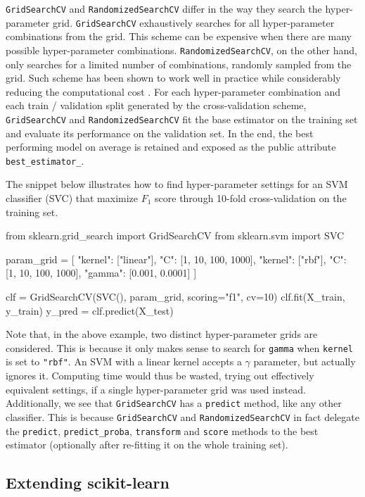 \documentclass{llncs}
\begin{document}
\texttt{GridSearchCV} and \texttt{RandomizedSearchCV} differ in the way they
search the hyper-parameter grid.  \texttt{GridSearchCV} exhaustively searches
for all hyper-parameter combinations from the grid. This scheme can be expensive
when there are many possible hyper-parameter combinations.
\texttt{RandomizedSearchCV}, on the other hand, only searches for a limited
number of combinations, randomly sampled from the grid. Such scheme has been
shown to work well in practice while considerably reducing the computational
cost \citep{bergstra2012}. For each hyper-parameter combination and each train /
validation split generated by the cross-validation scheme, \texttt{GridSearchCV}
and \texttt{RandomizedSearchCV} fit the base estimator on the training set and
evaluate its performance on the validation set.  In the end, the best performing
model on average is retained and exposed as the public attribute
\texttt{best\_estimator\_}.

The snippet below illustrates how to find
hyper-parameter settings for an SVM classifier (SVC)
that maximize $F_1$ score
through 10-fold cross-validation on the training set.
\begin{pythoncode}
from sklearn.grid_search import GridSearchCV
from sklearn.svm import SVC

param_grid = [
  {"kernel": ["linear"], "C": [1, 10, 100, 1000]},
  {"kernel": ["rbf"], "C": [1, 10, 100, 1000],
   "gamma": [0.001, 0.0001]}
]

clf = GridSearchCV(SVC(), param_grid, scoring="f1", cv=10)
clf.fit(X_train, y_train)
y_pred = clf.predict(X_test)
\end{pythoncode}
Note that, in the above example, two distinct hyper-parameter grids are
considered. This is because it only makes sense to search for \texttt{gamma}
when \texttt{kernel} is set to \texttt{"rbf"}.
An SVM with a linear kernel accepts a $\gamma$ parameter,
but actually ignores it. Computing time would thus be wasted, trying out effectively
equivalent settings, if a single hyper-parameter grid was used instead.
Additionally, we see that
\texttt{GridSearchCV} has a \texttt{predict} method, like any other classifier.
This is because \texttt{GridSearchCV} and \texttt{RandomizedSearchCV} in fact
delegate the \texttt{predict}, \texttt{predict\_proba}, \texttt{transform} and
\texttt{score} methods to the best estimator
(optionally after re-fitting it on the whole training set).

\subsection{Extending scikit-learn}
\end{document}
